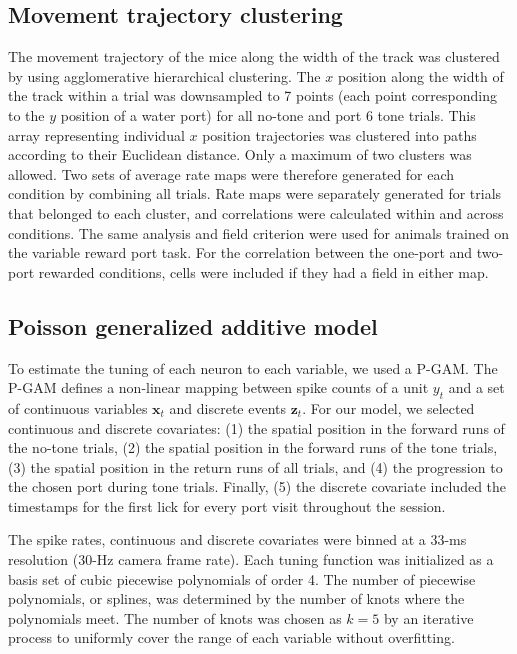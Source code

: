 \subsection{Movement trajectory clustering}

The movement trajectory of the mice along the width of the track was clustered by using agglomerative hierarchical clustering. The $x$ position along the width of the track within a trial was downsampled to 7 points (each point corresponding to the $y$ position of a water port) for all no-tone and port 6 tone trials. This array representing individual $x$ position trajectories was clustered into paths according to their Euclidean distance. Only a maximum of two clusters was allowed. Two sets of average rate maps were therefore generated for each condition by combining all trials. Rate maps were separately generated for trials that belonged to each cluster, and correlations were calculated within and across conditions. The same analysis and field criterion were used for animals trained on the variable reward port task. For the correlation between the one-port and two-port rewarded conditions, cells were included if they had a field in either map.

\subsection{Poisson generalized additive model}

To estimate the tuning of each neuron to each variable, we used a P-GAM. The P-GAM defines a non-linear mapping between spike counts of a unit $y_t$ and a set of continuous variables $\mathbf{x}_t$ and discrete events $\mathbf{z}_t$. For our model, we selected continuous and discrete covariates: (1) the spatial position in the forward runs of the no-tone trials, (2) the spatial position in the forward runs of the tone trials, (3) the spatial position in the return runs of all trials, and (4) the progression to the chosen port during tone trials. Finally, (5) the discrete covariate included the timestamps for the first lick for every port visit throughout the session.

The spike rates, continuous and discrete covariates were binned at a 33-ms resolution (30-Hz camera frame rate). Each tuning function was initialized as a basis set of cubic piecewise polynomials of order 4. The number of piecewise polynomials, or splines, was determined by the number of knots where the polynomials meet. The number of knots was chosen as $k = 5$ by an iterative process to uniformly cover the range of each variable without overfitting.

